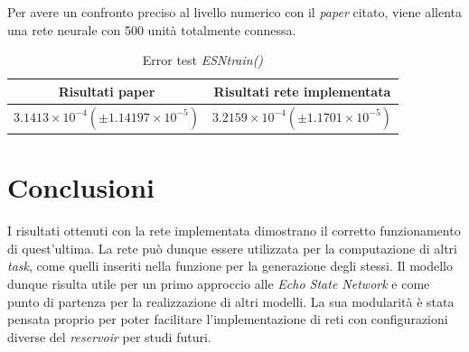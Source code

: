 Per avere un confronto preciso al livello numerico con il \textit{paper} citato, viene allenta una rete neurale con 500 unità totalmente connessa.
\begin{table}[h]
	\begin{center}
		\begin{tabular}{|c|c|}
			\hline
			Risultati paper & Risultati rete implementata \\
			\hline
			$3.1413 \times 10^{-4} (\pm1.14197 \times 10^{-5}) $ & 
			$3.2159 \times 10^{-4} (\pm1.1701 \times 10^{-5}) $\\
			\hline
		\end{tabular}
	\end{center}
\caption{Error test \textit{ESNtrain()}}
\end{table}

\section{Conclusioni}
I risultati ottenuti con la rete implementata dimostrano il corretto funzionamento di quest'ultima. La rete può dunque essere utilizzata per la computazione di altri \textit{task}, come quelli inseriti nella funzione per la generazione degli stessi. Il modello dunque risulta utile per un primo approccio alle \textit{Echo State Network} e come punto di partenza per la realizzazione di altri modelli. La sua modularità è stata pensata proprio per poter facilitare l'implementazione di reti con configurazioni diverse del \textit{reservoir} per studi futuri.


